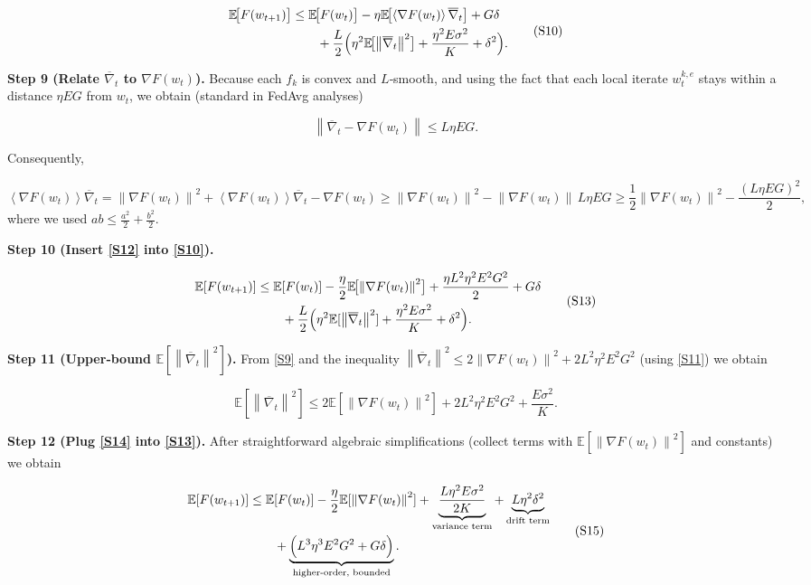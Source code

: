 \documentclass{article}
\newcommand{\E}{\mathbb{E}}
\newcommand{\norm}[1]{\left\lVert #1\right\rVert}
\newcommand{\inner}[1]{\left\langle #1\right\rangle}
\begin{document}
\[
\begin{aligned}
\E\!\bigl[F(w_{t+1})\bigr]
&\le \E\!\bigl[F(w_t)\bigr]
   -\eta \E\!\bigl[\inner{\nabla F(w_t)}{\overline{\nabla}_t}\bigr]
   + G\delta \\
&\qquad+\frac{L}{2}\Bigl(\eta^2\E\!\bigl[\norm{\overline{\nabla}_t}^2\bigr]
                     +\frac{\eta^2E\sigma^2}{K}
                     +\delta^2\Bigr).
\end{aligned}
\tag{S10}
\]

\noindent\textbf{Step 9 (Relate $\overline{\nabla}_t$ to $\nabla F(w_t)$).}  
Because each $f_k$ is convex and $L$‑smooth, and using the fact that each local iterate $w_{t}^{k,e}$ stays within a distance $\eta E G$ from $w_t$, we obtain (standard in FedAvg analyses)

\[
\norm{\overline{\nabla}_t - \nabla F(w_t)} \le L\eta E G .
\tag{S11}
\]

Consequently,

\[
\inner{\nabla F(w_t)}{\overline{\nabla}_t}
= \norm{\nabla F(w_t)}^2
  +\inner{\nabla F(w_t)}{\overline{\nabla}_t-\nabla F(w_t)}
\ge \norm{\nabla F(w_t)}^2 - \norm{\nabla F(w_t)}\,L\eta E G
\ge \frac12\norm{\nabla F(w_t)}^2 - \frac{(L\eta EG)^2}{2},
\tag{S12}
\]
where we used $ab\le\frac{a^2}{2}+\frac{b^2}{2}$.

\noindent\textbf{Step 10 (Insert \eqref{S12} into \eqref{S10}).}  

\[
\begin{aligned}
\E[F(w_{t+1})]
&\le \E[F(w_t)]
   -\frac{\eta}{2}\E\!\bigl[\norm{\nabla F(w_t)}^2\bigr]
   +\frac{\eta L^2\eta^2E^2G^2}{2}
   + G\delta \\
&\qquad+\frac{L}{2}\Bigl(\eta^2\E[\norm{\overline{\nabla}_t}^2]
                     +\frac{\eta^2E\sigma^2}{K}
                     +\delta^2\Bigr).
\end{aligned}
\tag{S13}
\]

\noindent\textbf{Step 11 (Upper‑bound $\E[\norm{\overline{\nabla}_t}^2]$).}  
From \eqref{S9} and the inequality $\norm{\overline{\nabla}_t}^2\le 2\norm{\nabla F(w_t)}^2 + 2L^2\eta^2E^2G^2$ (using \eqref{S11}) we obtain

\[
\E[\norm{\overline{\nabla}_t}^2]\le 2\E[\norm{\nabla F(w_t)}^2] + 2L^2\eta^2E^2G^2 +\frac{E\sigma^2}{K}.
\tag{S14}
\]

\noindent\textbf{Step 12 (Plug \eqref{S14} into \eqref{S13}).}  After straightforward algebraic simplifications (collect terms with $\E[\norm{\nabla F(w_t)}^2]$ and constants) we obtain

\[
\begin{aligned}
\E[F(w_{t+1})]
&\le \E[F(w_t)]
   -\frac{\eta}{2}\E[\norm{\nabla F(w_t)}^2]
   +\underbrace{\frac{L\eta^2E\sigma^2}{2K}}_{\text{variance term}}
   +\underbrace{L\eta^2\delta^2}_{\text{drift term}}\\
&\qquad +\underbrace{\Bigl(L^3\eta^3E^2G^2+G\delta\Bigr)}_{\text{higher‑order, bounded}} .
\end{aligned}
\tag{S15}
\]
\end{document}
